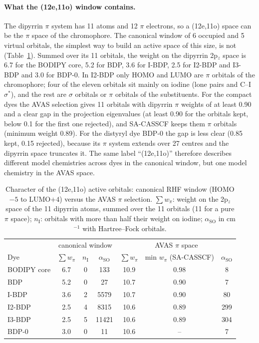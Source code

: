 \documentclass[journal=jctcce,manuscript=article,layout=twocolumn]{achemso}
\newcommand{\aso}{\alpha_\mathrm{SO}}
\begin{document}
\paragraph{What the (12e,11o) window contains.} The dipyrrin $\pi$ system has 11 atoms and 12
$\pi$ electrons, so a (12e,11o) space can be the $\pi$ space of the chromophore. The canonical window of 6
occupied and 5 virtual orbitals, the simplest way to build an active space of this size, is not
(Table~\ref{tab:window}). Summed over its 11 orbitals, the weight on the dipyrrin 2p$_z$ space is 6.7 for the BODIPY core, 5.2 for BDP, 3.6 for I-BDP, 2.5 for I2-BDP and I3-BDP
and 3.0 for BDP-0. In I2-BDP only HOMO and LUMO are $\pi$ orbitals of the chromophore; four of the eleven
orbitals sit mainly on iodine (lone pairs and C--I $\sigma^*$), and the rest are $\sigma$ orbitals or $\pi$
orbitals of the substituents. For the compact dyes the AVAS selection gives 11 orbitals with dipyrrin $\pi$
weights of at least 0.90 and a clear gap in the projection eigenvalues (at least 0.90 for the orbitals kept,
below 0.1 for the first one rejected), and SA-CASSCF keeps them $\pi$ orbitals (minimum weight 0.89). For
the distyryl dye BDP-0 the gap is less clear (0.85 kept, 0.15 rejected), because its $\pi$ system extends over
27 centres and the dipyrrin space truncates it. The same label
``(12e,11o)'' therefore describes different model chemistries across dyes in the canonical window, but
one model chemistry in the AVAS space.

\begin{table}
  \caption{Character of the (12e,11o) active orbitals: canonical RHF window (HOMO$-5$ to LUMO$+4$) versus
  the AVAS $\pi$ selection. $\sum w_\pi$: weight on the 2p$_z$ space of the 11 dipyrrin atoms, summed over
  the 11 orbitals (11 for a pure $\pi$ space); $n_\mathrm{I}$: orbitals with more than half their weight on
  iodine; $\aso$ in cm$^{-1}$ with Hartree--Fock orbitals.}
  \label{tab:window}
  \footnotesize\setlength{\tabcolsep}{4pt}
  \begin{tabular}{lcccccc}
    \toprule
    & \multicolumn{3}{c}{canonical window} & \multicolumn{3}{c}{AVAS $\pi$ space} \\
    Dye & $\sum w_\pi$ & $n_\mathrm{I}$ & $\aso$ & $\sum w_\pi$ & min $w_\pi$ (SA-CASSCF) & $\aso$ \\
    \midrule
    BODIPY core & 6.7 & 0 & 133   & 10.9 & 0.98 & 8 \\
    BDP         & 5.2 & 0 & 27    & 10.7 & 0.90 & 7 \\
    I-BDP       & 3.6 & 2 & 5579  & 10.7 & 0.90 & 80 \\
    I2-BDP      & 2.5 & 4 & 8315  & 10.6 & 0.89 & 299 \\
    I3-BDP      & 2.5 & 5 & 11421 & 10.6 & 0.89 & 304 \\
    BDP-0       & 3.0 & 0 & 11    & 10.6 & --   & 7 \\
    \bottomrule
  \end{tabular}
\end{table}
\end{document}
